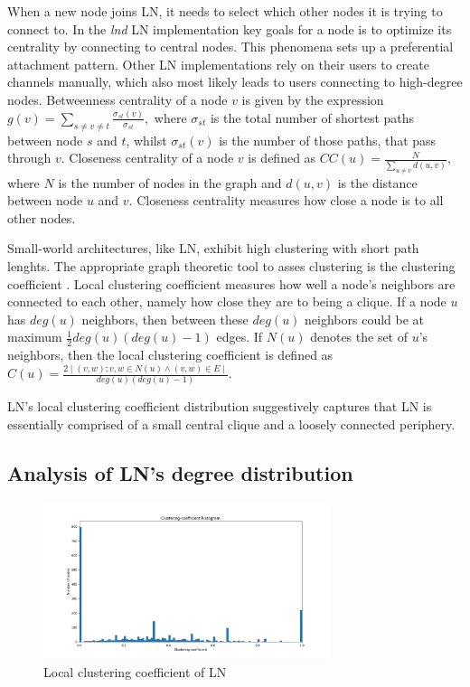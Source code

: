 \documentclass[runningheads]{llncs}
\begin{document}
When a new node joins LN, it needs to select which other nodes it is trying to connect to. In the \textit{lnd} LN implementation key goals for a node is to optimize its centrality by connecting to central nodes. This phenomena sets up a preferential attachment pattern. Other LN implementations rely on their users to create channels manually, which also most likely leads to users connecting to high-degree nodes. Betweenness centrality of a node $v$ is given by the expression $g(v)=\sum_{s\neq v \neq t}\frac{\sigma_{st}(v)}{\sigma_{st}},$ where $\sigma_{st}$ is the total number of shortest paths between node $s$ and $t$, whilst $\sigma_{st}(v)$ is the number of those paths, that pass through $v$. Closeness centrality  of a node $v$ is defined as $CC(u)=\frac{N}{\sum_{u\neq v}d(u,v)},$ where $N$ is the number of nodes in the graph and $d(u,v)$ is the distance between node $u$ and $v$.  Closeness centrality measures how close a node is to all other nodes. 

Small-world architectures, like LN, exhibit high clustering with short path lenghts. The appropriate graph theoretic tool to asses clustering is the clustering coefficient \cite{watts1998collective}. Local clustering coefficient measures how well a node's neighbors are connected to each other, namely how close they are to being a clique. If a node $u$ has $deg(u)$ neighbors, then between these $deg(u)$ neighbors could be at maximum $\frac{1}{2}deg(u)(deg(u)-1)$ edges. If $N(u)$ denotes the set of $u$'s neighbors, then the local clustering coefficient is defined as $C(u)=\frac{2\mid (v,w): v,w \in N(u) \land (v,w) \in E \mid}{deg(u)(deg(u)-1)}$. 

LN's local clustering coefficient distribution suggestively captures that LN is essentially comprised of a small central clique and a loosely connected periphery.

\subsection{Analysis of LN's degree distribution}

\begin{figure}
	\includegraphics[width=0.75\textwidth]{clusteringCoefficient.png}
	\caption{Local clustering coefficient of LN}\label{fig:localclustering}
\end{figure} 
\end{document}
